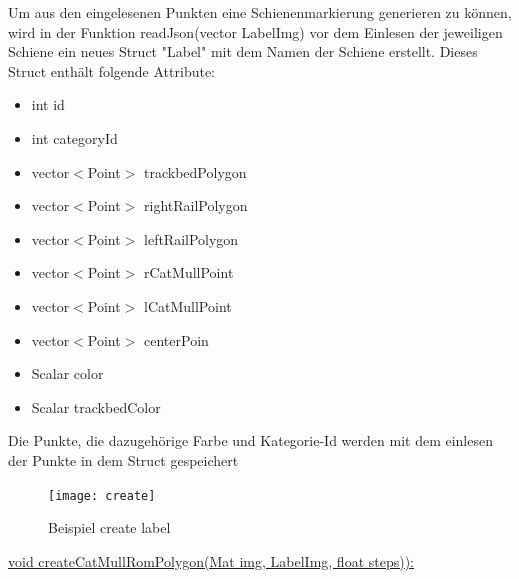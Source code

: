 \documentclass[11pt]{scrartcl}
\begin{document}
\noindent
Um aus den eingelesenen Punkten eine Schienenmarkierung generieren zu können, wird in der Funktion readJson(vector LabelImg) vor dem Einlesen der jeweiligen Schiene ein neues Struct "Label" mit dem Namen der Schiene erstellt. Dieses Struct enthält folgende Attribute:
\begin{itemize}
	\item int id
	\item int categoryId
	\item vector$<$Point$>$ trackbedPolygon
	\item vector$<$Point$>$  rightRailPolygon
	\item vector$<$Point$>$  leftRailPolygon
	\item vector$<$Point$>$  rCatMullPoint
	\item vector$<$Point$>$  lCatMullPoint
	\item vector$<$Point$>$  centerPoin
	\item Scalar color
	\item Scalar trackbedColor
\end{itemize}
\noindent
Die Punkte, die dazugehörige Farbe und Kategorie-Id werden mit dem einlesen der Punkte in dem Struct gespeichert
\begin{figure}[H]
  \texttt{[image: create]}
  \caption{Beispiel create label}
\end{figure}
\noindent
\underline{ void createCatMullRomPolygon(Mat img, LabelImg, float steps)):}
\\
\end{document}

